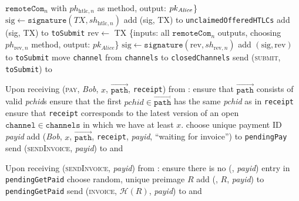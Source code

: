 \begin{algorithmic}[1]
            $\mathtt{remoteCom}_n$ with $ph_{\mathrm{htlc}, n}$ as method,
            output: $pk_{\mathit{Alice}}$\}
            \State $\mathrm{sig} \gets \mathtt{signature}\left(TX,
            sh_{\mathrm{htlc}, n}\right)$
              \State add (sig, TX) to \texttt{unclaimedOfferedHTLCs}
              \State add (sig, TX) to \texttt{toSubmit}
            \EndIf
          \EndFor
        \Else {}
          \State $\mathrm{rev} \gets$ TX \{inputs: all $\mathtt{remoteCom}_n$
          outputs, choosing $ph_{\mathrm{rev}, n}$ method, output:
          $pk_{\mathit{Alice}}$\}
          \State $\mathrm{sig} \gets \mathtt{signature}\left(\mathrm{rev},
          sh_{\mathrm{rev}, n}\right)$
          \State add $\left(\mathrm{sig}, \mathrm{rev}\right)$ to
          \texttt{toSubmit}
        \EndIf
        \State move \texttt{channel} from \texttt{channels} to
        \texttt{closedChannels}
      \EndFor
      \State send (\textsc{submit}, \texttt{toSubmit}) to \ledger
    \EndIndent
    \State

    \State {}
    \State Upon receiving (\textsc{pay}, \textit{Bob}, $x$,
    $\overrightarrow{\mathtt{path}}$, \texttt{receipt}) from \environment:
    \Indent
      \State ensure that $\overrightarrow{\mathtt{path}}$ consists of valid
      \textit{pchid}s
      \State ensure that the first $\mathit{pchid} \in
      \overrightarrow{\mathtt{path}}$ has the same \textit{pchid} as in
      \texttt{receipt}
      \State ensure that \texttt{receipt} corresponds to the latest version of
      an open $\mathtt{channel} \in \mathtt{channels}$ in which we have at least
      $x$.
      \State choose unique payment ID \textit{payid} 
      \State add (\textit{Bob}, $x$, $\overrightarrow{\mathtt{path}}$,
      \texttt{receipt}, \textit{payid}, ``waiting for invoice'') to
      \texttt{pendingPay}
      \State send (\textsc{sendInvoice}, \textit{payid}) to \bob{} and
      \adversary
    \EndIndent
    \State

    \State Upon receiving (\textsc{sendInvoice}, \textit{payid}) from \bob:
    \Indent
      \State ensure there is no (\bob, \textit{payid}) entry in
      \texttt{pendingGetPaid}
      \State choose random, unique preimage $R$
      \State add (\bob, $R$, \textit{payid}) to \texttt{pendingGetPaid}
      \State send (\textsc{invoice}, $\mathcal{H}\left(R\right)$,
      \textit{payid}) to \bob{} and \adversary
    \EndIndent
    \State


\end{algorithmic}
